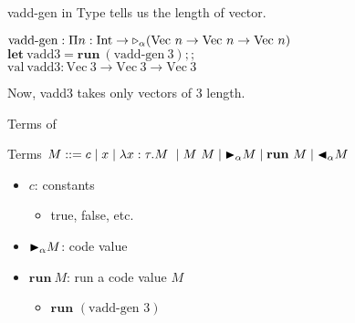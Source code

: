 \documentclass[dvipdfmx,aspectratio=169, 20pt]{beamer}
\begin{document}
\begin{frame}[fragile]{vadd-gen in \LMD}
    Type tells us the length of vector.
    \newcommand{\Vn}{\text{Vec}\ n}
    \newcommand{\Vt}{\text{Vec}\ 3}
    \begin{tabbing}
        \( \text{vadd-gen} : \Pi n:\I \to \TW_\alpha (\Vn \to \Vn \to \Vn) \) \\[2mm]
        \( \textbf{let}\ \text{vadd3} = \textbf{run}\ (\text{vadd-gen}\ 3);; \) \\
        \( \text{val}\ \text{vadd3} : \Vt \to \Vt \to \Vt \) \\[2mm]
    \end{tabbing}
    Now, vadd3 takes only vectors of 3 length.
\end{frame}

\begin{frame}[fragile]{Terms of \LMD}
    \begin{block}{Terms}
        \( M ::= c \mid x \mid \lambda x:\tau.M\ \mid M\ M \mid {\mathop{\blacktriangleright}}_\alpha M \mid \textbf{run}\ M \mid {\mathop{\blacktriangleleft}}_\alpha M \)
    \end{block}
    \begin{itemize}
        \item \( c \): constants
            \begin{itemize}
                    \item true, false, etc.
            \end{itemize}
        \item \( {\mathop{\blacktriangleright}}_\alpha M \): code value
        \item \( \textbf{run}\ M \): run a code value \( M \)
            \begin{itemize}
                \item \( \textbf{run }(\text{vadd-gen }3)\)
            \end{itemize}
    \end{itemize}
\end{frame}
\end{document}
